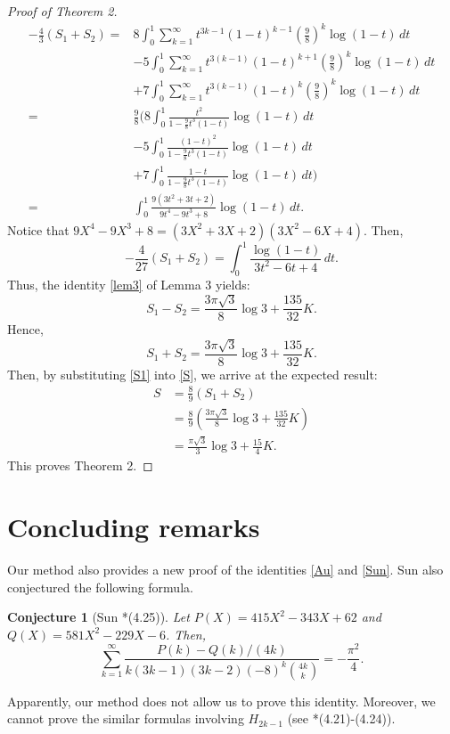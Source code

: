 \documentclass{amsart}
\numberwithin{equation}{section}
\newtheorem{conj}{Conjecture}
\begin{document}
\begin{proof}[Proof of Theorem 2]
    \begin{align*}
        -\frac43(S_1+S_2)=&8\int_0^1\sum_{k=1}^\infty t^{3k-1}(1-t)^{k-1}\left(\frac98\right)^k\log{(1-t)}\,dt\\&-5\int_0^1\sum_{k=1}^\infty t^{3(k-1)}(1-t)^{k+1}\left(\frac98\right)^k\log(1-t)\,dt\\&+7\int_0^1\sum_{k=1}^\infty t^{3(k-1)}(1-t)^k\left(\frac98\right)^k\log(1-t)\,dt
        \\=&\frac98\Bigg(8\int_0^1\frac{t^2}{1-\frac98t^3(1-t)}\log(1-t)\,dt\\&-5\int_0^1\frac{(1-t)^2}{1-\frac98t^3(1-t)}\log(1-t)\,dt\\&+7\int_0^1\frac{1-t}{1-\frac98t^3(1-t)}\log(1-t)\,dt\Bigg)\\=&\int_0^1\frac{9(3t^2+3t+2)}{9t^4-9t^3+8}\log(1-t)\,dt.
    \end{align*}
    Notice that $9X^4-9X^3+8=(3X^2+3X+2)(3X^2-6X+4)$. Then,
    \[-\frac4{27}(S_1+S_2)=\int_0^1\frac{\log(1-t)}{3t^2-6t+4}\,dt.\]
    Thus, the identity \eqref{lem3} of Lemma 3 yields:
    \[S_1-S_2=\frac{3\pi\sqrt{3}}{8}\log3+\frac{135}{32}K.\]
    Hence,
    \begin{equation}
    S_1+S_2=\frac{3\pi\sqrt{3}}{8}\log3+\frac{135}{32}K.
    \label{S1}
    \end{equation}
    Then, by substituting \eqref{S1} into \eqref{S}, we arrive at the expected result:
    \begin{align*}
        S&=\frac89(S_1+S_2)\\
        &=\frac89\left(\frac{3\pi\sqrt{3}}{8}\log3+\frac{135}{32}K\right)\\
        &=\frac{\pi\sqrt3}3\log{3}+\frac{15}{4}K.
    \end{align*}
    This proves Theorem 2.
    \end{proof}
\section{Concluding remarks}
Our method also provides a new proof of the identities \eqref{Au} and \eqref{Sun}. Sun also conjectured the following formula. 
\begin{conj}[Sun \cite{series2}*{(4.25)}]
Let $P(X)=415X^2-343X+62$ and $Q(X)=581X^2-229X-6$. Then,
\[\sum_{k=1}^\infty \frac{P(k)-Q(k)/(4k)}{k(3k-1)(3k-2)(-8)^k\binom{4k}{k}}=-\frac{\pi^2}{4}.\]
\end{conj}
Apparently, our method does not allow us to prove this identity. Moreover, we cannot prove the similar formulas involving $H_{2k-1}$ (see \cite{series2}*{(4.21)-(4.24)}).


\end{document}
